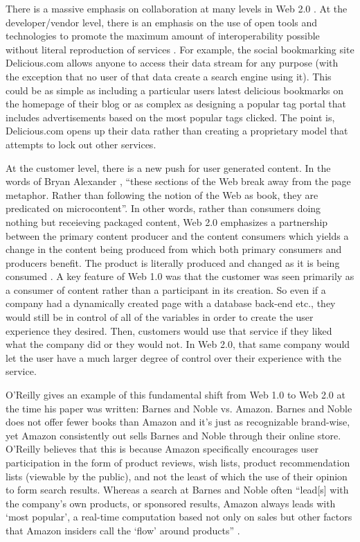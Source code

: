 There is a massive emphasis on collaboration at many levels in Web 2.0
\citep{oreilly2007}.  At the developer/vendor level, there is an emphasis on the
use of open tools and technologies to promote the maximum amount of
interoperability possible without literal reproduction of services
\citep{miller2005}.  For example, the social bookmarking site Delicious.com
allows anyone to access their data stream for any purpose (with the exception
that no user of that data create a search engine using it).  This could be as
simple as including a particular users latest delicious bookmarks on the
homepage of their blog or as complex as designing a popular tag portal that
includes advertisements based on the most popular tags clicked.  The point is,
Delicious.com opens up their data rather than creating a proprietary model that
attempts to lock out other services.

At the customer level, there is a new push for user generated content.  In the
words of Bryan Alexander \citeyearpar{alexander2006}, ``these sections of the
Web break away from the page metaphor. Rather than following the notion of the
Web as book, they are predicated on microcontent''.  In other words, rather than
consumers doing nothing but receieving packaged content, Web 2.0 emphasizes a
partnership between the primary content producer and the content consumers which
yields a change in the content being produced from which both primary consumers
and producers benefit.  The product is literally produced and changed as it is
being consumed \citep{alexander2006}.  A key feature of Web 1.0 was that the
customer was seen primarily as a consumer of content rather than a participant
in its creation.  So even if a company had a dynamically created page with a
database back-end etc., they would still be in control of all of the variables
in order to create the user experience they desired.  Then, customers would use
that service if they liked what the company did or they would not.  In Web 2.0,
that same company would let the user have a much larger degree of control over
their experience with the service.

O'Reilly \citeyearpar{oreilly2007} gives an example of this fundamental shift
from Web 1.0 to Web 2.0 at the time his paper was written: Barnes and Noble
vs. Amazon.  Barnes and Noble does not offer fewer books than Amazon and it's
just as recognizable brand-wise, yet Amazon consistently out sells Barnes and
Noble through their online store.  O'Reilly believes that this is because Amazon
specifically encourages user participation in the form of product reviews, wish
lists, product recommendation lists (viewable by the public), and not the least
of which the use of their opinion to form search results.  Whereas a search at
Barnes and Noble often ``lead[s] with the company's own products, or sponsored
results, Amazon always leads with `most popular', a real-time computation based
not only on sales but other factors that Amazon insiders call the `flow' around
products'' \citep{oreilly2007}.

